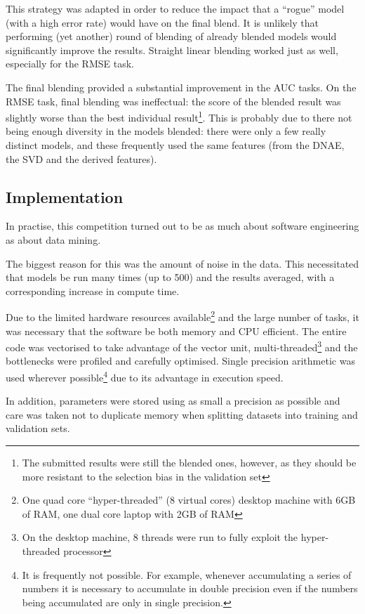 \documentclass{article}
\begin{document}
This strategy was adapted in order to reduce the impact that a ``rogue'' model (with a high error rate) would have on the final blend.  It is unlikely that performing (yet another) round of blending of already blended models would significantly improve the results.  Straight linear blending worked just as well, especially for the RMSE task.

The final blending provided a substantial improvement in the AUC tasks.  On the RMSE task, final blending was ineffectual: the score of the blended result was slightly worse than the best individual result\footnote{The submitted results were still the blended ones, however, as they should be more resistant to the selection bias in the validation set}.  This is probably due to there not being enough diversity in the models blended: there were only a few really distinct models, and these frequently used the same features (from the DNAE, the SVD and the derived features).

\subsection{Implementation}

In practise, this competition turned out to be as much about software engineering as about data mining.

The biggest reason for this was the amount of noise in the data.  This necessitated that models be run many times (up to 500) and the results averaged, with a corresponding increase in compute time.

Due to the limited hardware resources available\footnote{One quad core ``hyper-threaded'' (8 virtual cores) desktop machine with 6GB of RAM, one dual core laptop with 2GB of RAM} and the large number of tasks, it was necessary that the software be both memory and CPU efficient.
The entire code was vectorised to take advantage of the vector unit, multi-threaded\footnote{On the desktop machine, 8 threads were run to fully exploit the hyper-threaded processor} and the bottlenecks were profiled and carefully optimised.  Single precision arithmetic was used wherever possible\footnote{It is frequently not possible.  For example, whenever accumulating a series of numbers it is necessary to accumulate in double precision even if the numbers being accumulated are only in single precision.} due to its advantage in execution speed.

In addition, parameters were stored using as small a precision as possible and care was taken not to duplicate memory when splitting datasets into training and validation sets.
\end{document}
